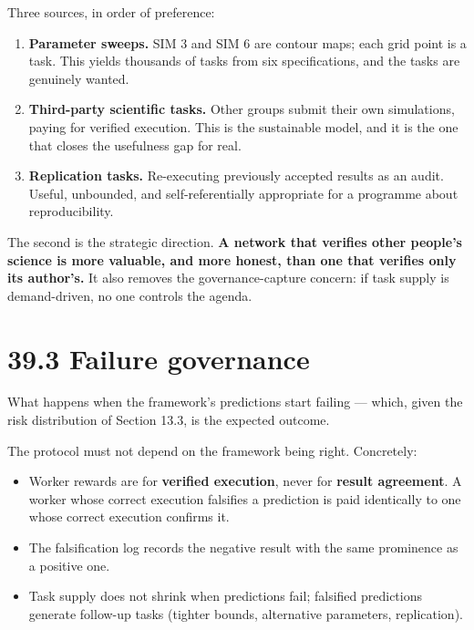 \documentclass[
  11pt]{report}
\providecommand{\tightlist}{%
  \setlength{\itemsep}{0pt}\setlength{\parskip}{0pt}}
\begin{document}
Three sources, in order of preference:

\begin{enumerate}
\def\labelenumi{\arabic{enumi}.}
\tightlist
\item
  \textbf{Parameter sweeps.} SIM 3 and SIM 6 are contour maps; each grid
  point is a task. This yields thousands of tasks from six
  specifications, and the tasks are genuinely wanted.
\item
  \textbf{Third-party scientific tasks.} Other groups submit their own
  simulations, paying for verified execution. This is the sustainable
  model, and it is the one that closes the usefulness gap for real.
\item
  \textbf{Replication tasks.} Re-executing previously accepted results
  as an audit. Useful, unbounded, and self-referentially appropriate for
  a programme about reproducibility.
\end{enumerate}

The second is the strategic direction. \textbf{A network that verifies
other people's science is more valuable, and more honest, than one that
verifies only its author's.} It also removes the governance-capture
concern: if task supply is demand-driven, no one controls the agenda.

\hypertarget{failure-governance}{%
\section{39.3 Failure governance}\label{failure-governance}}

What happens when the framework's predictions start failing --- which,
given the risk distribution of Section 13.3, is the expected outcome.

The protocol must not depend on the framework being right. Concretely:

\begin{itemize}
\tightlist
\item
  Worker rewards are for \textbf{verified execution}, never for
  \textbf{result agreement}. A worker whose correct execution falsifies
  a prediction is paid identically to one whose correct execution
  confirms it.
\item
  The falsification log records the negative result with the same
  prominence as a positive one.
\item
  Task supply does not shrink when predictions fail; falsified
  predictions generate follow-up tasks (tighter bounds, alternative
  parameters, replication).
\end{itemize}
\end{document}
